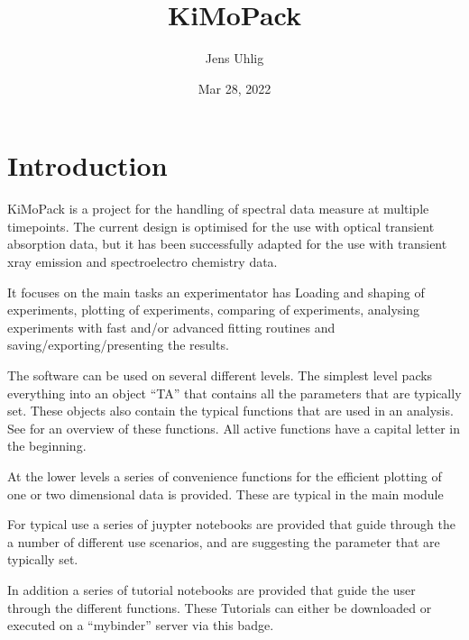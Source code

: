 \documentclass[letterpaper,10pt,english]{sphinxmanual}
\title{KiMoPack}
\date{Mar 28, 2022}
\author{Jens Uhlig}
\begin{document}
\pagestyle{empty}
\sphinxmaketitle
\pagestyle{plain}
\sphinxtableofcontents
\pagestyle{normal}
\label{\detokenize{index::doc}}



\chapter{Introduction}
\label{\detokenize{Introduction:introduction}}\label{\detokenize{Introduction::doc}}
KiMoPack is a project for the handling of spectral data measure at
multiple time\sphinxhyphen{}points. The current design is optimised for the use with
optical transient absorption data, but it has been successfully adapted
for the use with transient x\sphinxhyphen{}ray emission and spectro\sphinxhyphen{}electro chemistry
data.

It focuses on the main tasks an experimentator has
Loading and shaping of experiments, plotting of experiments, comparing of experiments,
analysing experiments with fast and/or advanced fitting routines and saving/exporting/presenting
the results.

The software can be used on several different levels. The simplest level packs everything
into an object “TA” that contains all the parameters that are typically set.
These objects also contain the typical functions that are used in an analysis.
See {\hyperref[\detokenize{Main_tasks:main-tasks-overview}]{}} for an overview of these functions.
All active functions have a capital letter in the beginning.

At the lower levels a series of convenience functions for the efficient plotting of
one or two dimensional data is provided. These are typical in the main module

For typical use a series of juypter notebooks are provided that guide
through the a number of different use scenarios, and are suggesting the
parameter that are typically set.
\begin{description}
\item[{In addition a series of tutorial notebooks are provided that guide the user through the different functions. These Tutorials can either be downloaded or executed on a “mybinder” server via this badge.}] \leavevmode
{}

\end{description}
\end{document}
